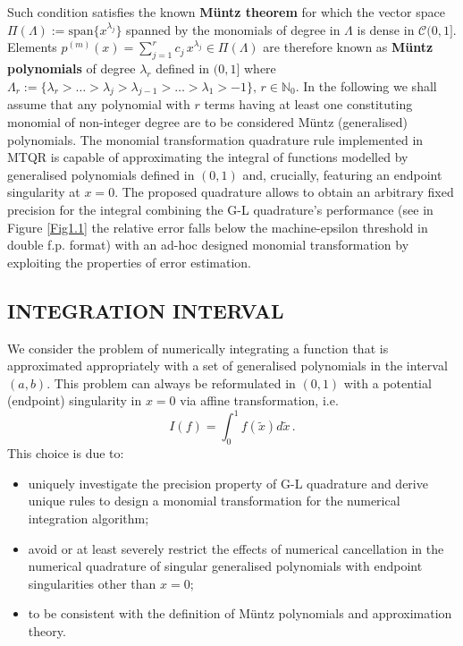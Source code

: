 \documentclass[a4paper, twosided]{book}
\begin{document}
\noindent
Such condition satisfies the known \color{poliDarkBlue} \textbf{Müntz theorem} \color{black} for which the vector space $\Pi(\Lambda):=\text{span}\{x^{\lambda_j}\}$ spanned by the monomials of degree in $\Lambda$ is dense in $\mathcal{C}(0,1]$. Elements $p^{(m)}(x) = \sum_{j=1}^{r} c_j\,x^{\lambda_j}\in\Pi(\Lambda)$ are therefore known as \color{poliDarkBlue} \textbf{Müntz polynomials} \color{black} of degree $\lambda_r$ defined in $(0,1]$ where  $\Lambda_r:=\{\lambda_r>\dots>\lambda_j>\lambda_{j-1}>\dots>\lambda_1>-1\},\, r\in\mathbb{N}_0$. In the following we shall assume that any polynomial with $r$ terms having at least one constituting monomial of non-integer degree are to be considered Müntz (generalised) polynomials. The monomial transformation quadrature rule implemented in MTQR is capable of approximating the integral of functions modelled by generalised polynomials defined in $(0,1)$ and, crucially, featuring an endpoint singularity at $x=0$. The proposed quadrature allows to obtain an arbitrary fixed precision for the integral combining the G-L quadrature's performance (see in Figure \ref{Fig1.1} the relative error falls below the machine-epsilon threshold in double f.p. format) with an ad-hoc designed monomial transformation by exploiting the properties of error estimation.

\newpage
\subsection[Integration interval]{\changefont INTEGRATION INTERVAL}\label{SubSec1.2.5}

We consider the problem of numerically integrating a function that is approximated appropriately with a set of generalised polynomials in the interval $(a,b)$. This problem can always be reformulated in $(0,1)$ with a potential (endpoint) singularity in $x=0$ via affine transformation, i.e. 
\begin{equation}\label{eq1.11}
    I(f) = \int_0^1 f(\tilde{x}) d\tilde{x}\,.
\end{equation}
This choice is due to:
\begin{itemize}
  \item uniquely investigate the precision property of G-L quadrature and derive unique rules to design a monomial transformation for the numerical integration algorithm;
  \item avoid or at least severely restrict the effects of numerical cancellation in the numerical quadrature of singular generalised polynomials with endpoint singularities other than $x=0$; 
  \item to be consistent with the definition of Müntz polynomials and approximation theory.
\end{itemize}
\end{document}
